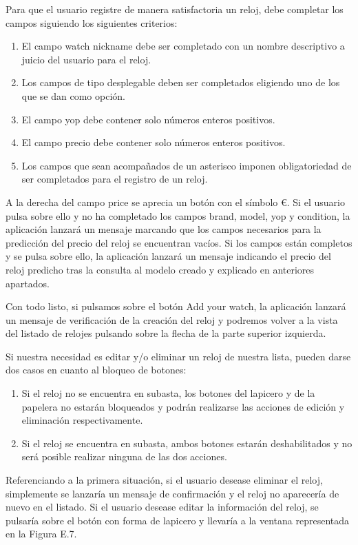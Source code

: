 	Para que el usuario registre de manera satisfactoria un reloj, debe completar los campos siguiendo los siguientes criterios:
	
	\begin{enumerate}
		\item El campo watch nickname debe ser completado con un nombre descriptivo a juicio del usuario para el reloj.
		\item Los campos de tipo desplegable deben ser completados eligiendo uno de los que se dan como opción.
		\item El campo yop debe contener solo números enteros positivos.
		\item El campo precio debe contener solo números enteros positivos.
		\item Los campos que sean acompañados de un asterisco imponen obligatoriedad de ser completados para el registro de un reloj.
	\end{enumerate}
	
	A la derecha del campo price se aprecia un botón con el símbolo €. Si el usuario pulsa sobre ello y no ha completado los campos brand, model, yop y condition, la aplicación lanzará un mensaje marcando que los campos necesarios para la predicción del precio del reloj se encuentran vacíos. Si los campos están completos y se pulsa sobre ello, la aplicación lanzará un mensaje indicando el precio del reloj predicho tras la consulta al modelo creado y explicado en anteriores apartados.
	
	Con todo listo, si pulsamos sobre el botón Add your watch, la aplicación lanzará un mensaje de verificación de la creación del reloj y podremos volver a la vista del listado de relojes pulsando sobre la flecha de la parte superior izquierda.

	Si nuestra necesidad es editar y/o eliminar un reloj de nuestra lista, pueden darse dos casos en cuanto al bloqueo de botones:
	\begin{enumerate}
		\item Si el reloj no se encuentra en subasta, los botones del lapicero y de la papelera no estarán bloqueados y podrán realizarse las acciones de edición y eliminación respectivamente.
		\item Si el reloj se encuentra en subasta, ambos botones estarán deshabilitados y no será posible realizar ninguna de las dos acciones.
	\end{enumerate}
	
	Referenciando a la primera situación, si el usuario desease eliminar el reloj, simplemente se lanzaría un mensaje de confirmación y el reloj no aparecería de nuevo en el listado. Si el usuario desease editar la información del reloj, se pulsaría sobre el botón con forma de lapicero y llevaría a la ventana representada en la Figura E.7.

